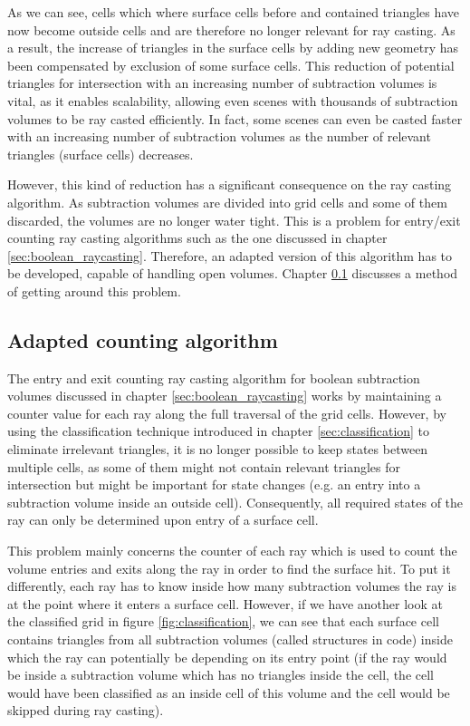 As we can see, cells which where surface cells before and contained triangles have now become outside cells and are therefore no longer relevant for ray casting. As a result, the increase of triangles in the surface cells by adding new geometry has been compensated by exclusion of some surface cells. This reduction of potential triangles for intersection with an increasing number of subtraction volumes is vital, as it enables scalability, allowing even scenes with thousands of subtraction volumes to be ray casted efficiently. In fact, some scenes can even be casted faster with an increasing number of subtraction volumes as the number of relevant triangles (surface cells) decreases.

However, this kind of reduction has a significant consequence on the ray casting algorithm. As subtraction volumes are divided into grid cells and some of them discarded, the volumes are no longer water tight. This is a problem for entry/exit counting ray casting algorithms such as the one discussed in chapter \ref{sec:boolean_raycasting}. Therefore, an adapted version of this algorithm has to be developed, capable of handling open volumes. Chapter \ref{sec:adapted_ray_casting} discusses a method of getting around this problem.


\subsection{Adapted counting algorithm}
\label{sec:adapted_ray_casting}

The entry and exit counting ray casting algorithm for boolean subtraction volumes discussed in chapter \ref{sec:boolean_raycasting} works by maintaining a counter value for each ray along the full traversal of the grid cells. However, by using the  classification technique introduced in chapter \ref{sec:classification} to eliminate irrelevant triangles, it is no longer possible to keep states between multiple cells, as some of them might not contain relevant triangles for intersection but might be important for state changes (e.g. an entry into a subtraction volume inside an outside cell). Consequently, all required states of the ray can only be determined upon entry of a surface cell.

This problem mainly concerns the counter of each ray which is used to count the volume entries and exits along the ray in order to find the surface hit. To put it differently, each ray has to know inside how many subtraction volumes the ray is at the point where it enters a surface cell. However, if we have another look at the classified grid in figure \ref{fig:classification}, we can see that each surface cell contains triangles from all subtraction volumes (called structures in code) inside which the ray can potentially be depending on its entry point (if the ray would be inside a subtraction volume which has no triangles inside the cell, the cell would have been classified as an inside cell of this volume and the cell would be skipped during ray casting). 

